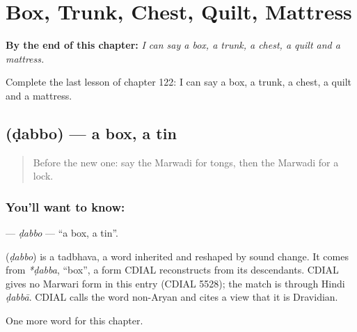
\chapter{Box, Trunk, Chest, Quilt, Mattress}
\label{ch:mw-box-trunk-chest-quilt-mattress}

\begin{chapteropening}
\textbf{By the end of this chapter:} \emph{I can say a box, a trunk, a chest, a quilt and a mattress.}

Complete the last lesson of chapter 122: I can say a box, a trunk, a chest, a quilt and a mattress.
\end{chapteropening}

\section[\texorpdfstring{\mw{डब्बो} (ḍabbo)}{डब्बो (ḍabbo)}]{ (ḍabbo) — a box, a tin}

\label{lesson:MW-C122-dabbo}



\begin{quote}
Before the new one: say the Marwadi for tongs, then the Marwadi for a lock.
\end{quote}

\subsection*{You'll want to know: }
\textbf{} — \emph{ḍabbo} — \textquotedblleft{}a box, a tin\textquotedblright{}.

\begin{cousinweb}
\textbf{} (\emph{ḍabbo}) is a tadbhava, a word inherited and reshaped by sound change. It comes from \emph{*ḍabba}, \textquotedblleft{}box\textquotedblright{}, a form CDIAL reconstructs from its descendants. CDIAL gives no Marwari form in this entry (CDIAL 5528); the match is through Hindi \emph{ḍabbā}. CDIAL calls the word non-Aryan and cites a view that it is Dravidian.
\end{cousinweb}

\begin{grammarlens}[title={What you've built}]
One more word for this chapter.
\end{grammarlens}

